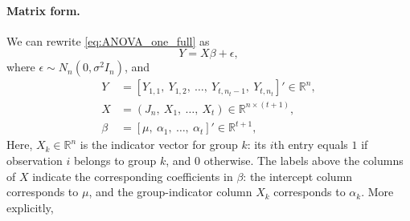 \documentclass{article}
\theoremstyle{break}
\newcommand{\R}{\ensuremath{\mathbb{R}}}
\begin{document}
\paragraph{Matrix form.} 
We can rewrite \eqref{eq:ANOVA_one_full} as 
\[
Y=X\beta+\epsilon,
\]
where $\epsilon \sim N_n(0, \sigma^2 I_n)$, and
\begin{align*}
    Y &= [Y_{1,1},\ Y_{1,2},\ \ldots,\ Y_{t,n_t-1},\ Y_{t, n_t}]' \in \R^n,\\
    X &= (J_n,\ X_1,\ \ldots,\ X_t) \in \R^{n \times (t+1)},\\
    \beta &= [\mu,\ \alpha_1,\ \ldots,\ \alpha_t]' \in \R^{t+1},
\end{align*}
Here, $X_k\in\R^n$ is the indicator vector for group $k$: its $i$th entry equals $1$ if observation $i$ belongs to group $k$, and $0$ otherwise. The labels above the columns of $X$ indicate the corresponding coefficients in $\beta$: the intercept column corresponds to $\mu$, and the group-indicator column $X_k$ corresponds to $\alpha_k$. More explicitly,
\end{document}
